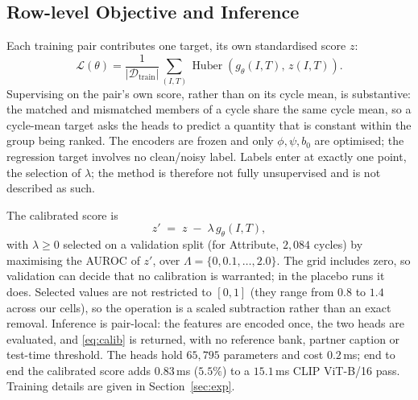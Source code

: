 \subsection{Row-level Objective and Inference}
Each training pair contributes one target, its own standardised score $z$:
\begin{equation}
  \mathcal{L}(\theta) = \frac{1}{|\mathcal{D}_{\text{train}}|}
  \sum_{(I,T)} \operatorname{Huber}\!\left(g_\theta(I,T),\, z(I,T)\right).
  \label{eq:loss}
\end{equation}
Supervising on the pair's own score, rather than on its cycle mean, is substantive:
the matched and mismatched members of a cycle share the same cycle mean, so a
cycle-mean target asks the heads to predict a quantity that is constant within the
group being ranked. The encoders are frozen and only $\phi,\psi,b_0$ are optimised;
the regression target involves no clean/noisy label. Labels enter at exactly one
point, the selection of $\lambda$; the method is therefore not fully unsupervised and
is not described as such.

The calibrated score is
\begin{equation}
  z' \;=\; z \;-\; \lambda\, g_\theta(I,T),
  \label{eq:calib}
\end{equation}
with $\lambda\ge0$ selected on a validation split (for Attribute, $2{,}084$ cycles)
by maximising the AUROC of $z'$, over $\Lambda=\{0,0.1,\dots,2.0\}$. The grid
includes zero, so validation can decide that no calibration is warranted; in the
placebo runs it does. Selected values are not restricted to $[0,1]$ (they range from
$0.8$ to $1.4$ across our cells), so the operation is a scaled subtraction rather
than an exact removal. Inference is pair-local: the features are encoded once, the two heads
are evaluated, and \eqref{eq:calib} is returned, with no reference bank, partner
caption or test-time threshold. The heads hold $65{,}795$ parameters and cost
$0.2$\,ms; end to end the calibrated score adds $0.83$\,ms ($5.5\%$) to a
$15.1$\,ms CLIP ViT-B/16 pass. Training details are given in Section~\ref{sec:exp}.
